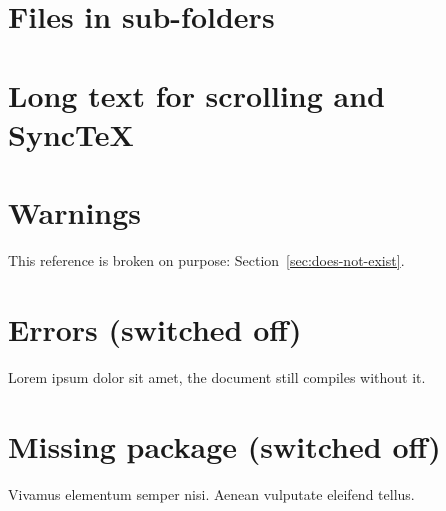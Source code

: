 \documentclass[11pt,a4paper]{article}
\begin{document}
\section{Files in sub-folders}\label{sec:input}


\section{Long text for scrolling and SyncTeX}\label{sec:long}
\lipsum[1-6]

\section{Warnings}\label{sec:warnings}
This reference is broken on purpose: Section~\ref{sec:does-not-exist}.

\section{Errors (switched off)}\label{sec:errors}
Lorem ipsum dolor sit amet, the document still compiles without it.

\section{Missing package (switched off)}\label{sec:missing}
Vivamus elementum semper nisi. Aenean vulputate eleifend tellus.
\end{document}
